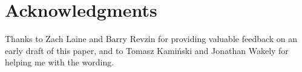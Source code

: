 \documentclass{wg21}
\begin{document}
\section{Acknowledgments}

Thanks to Zach Laine and Barry Revzin for providing valuable feedback on an early draft of this paper,
and to Tomasz Kamiński and Jonathan Wakely for helping me with the wording.







\renewcommand{\section}[2]{}%

\begin{thebibliography}{9}


\end{thebibliography}
\end{document}
